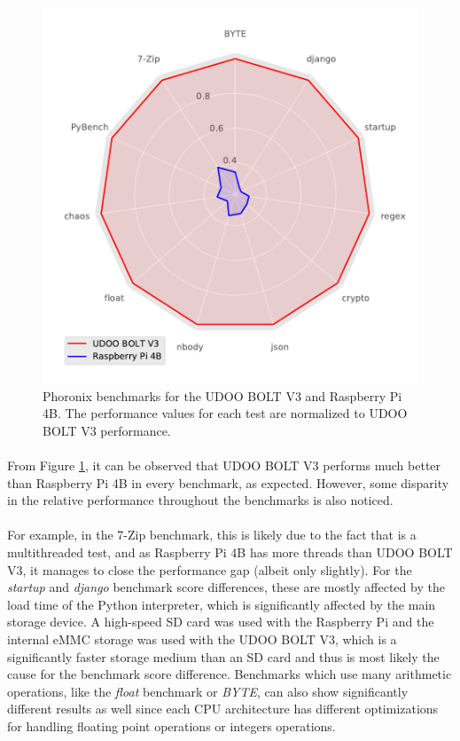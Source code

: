\clearpage 

\begin{figure}[H]
    \centering
    \includegraphics[width=0.6 \linewidth]{images/phoronix-benchmarks.pdf}
    \caption [Phoronix benchmarks for the UDOO BOLT V3 and Raspberry Pi 4B.]{ Phoronix benchmarks for the UDOO BOLT V3 and Raspberry Pi 4B. The performance values for each test are normalized to UDOO BOLT V3 performance.}
    \label{fig:phronix-benchmarks}
\end{figure}


\paragraph{} From Figure \ref{fig:phronix-benchmarks}, it can be observed that UDOO BOLT V3 performs much better than Raspberry Pi 4B in every benchmark, as expected. However, some disparity in the relative performance throughout the benchmarks is also noticed. 

\paragraph{} For example, in the 7-Zip benchmark, this is likely due to the fact that is a multithreaded test, and as Raspberry Pi 4B has more threads than UDOO BOLT V3, it manages to close the performance gap (albeit only slightly). For the \textit{startup} and \textit{django} benchmark score differences, these are mostly affected by the load time of the Python interpreter, which is significantly affected by the main storage device. A high-speed SD card was used with the Raspberry Pi and the internal eMMC storage was used with the UDOO BOLT V3, which is a significantly faster storage medium than an SD card and thus is most likely the cause for the benchmark score difference. Benchmarks which use many arithmetic operations, like the \textit{float} benchmark or \textit{BYTE}, can also show significantly different results as well since each \acs{CPU} architecture has different optimizations for handling floating point operations or integers operations.

